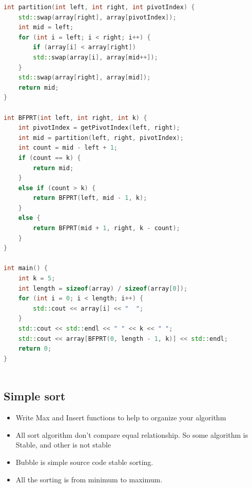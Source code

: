 \documentclass[a4paper,11pt,twoside]{book}
\begin{document}
\begin{itemize}
\begin{lstlisting}[frame=single, language=c++, basicstyle=\scriptsize]
int partition(int left, int right, int pivotIndex) {
	std::swap(array[right], array[pivotIndex]);
	int mid = left;
	for (int i = left; i < right; i++) {
		if (array[i] < array[right])
		std::swap(array[i], array[mid++]);
	}
	std::swap(array[right], array[mid]);
	return mid;
}

int BFPRT(int left, int right, int k) {
	int pivotIndex = getPivotIndex(left, right);
	int mid = partition(left, right, pivotIndex);
	int count = mid - left + 1;
	if (count == k) {
		return mid;
	}
	else if (count > k) {
		return BFPRT(left, mid - 1, k);
	}
	else {
		return BFPRT(mid + 1, right, k - count);
	}
}

int main() {
	int k = 5;
	int length = sizeof(array) / sizeof(array[0]);
	for (int i = 0; i < length; i++) {
		std::cout << array[i] << "  ";
	}
	std::cout << std::endl << " " << k << " ";
	std::cout << array[BFPRT(0, length - 1, k)] << std::endl;
	return 0;
}
	
\end{lstlisting}

\end{itemize}

\subsection{Simple sort}
\begin{itemize}
	\item Write Max and Insert functions to help to organize your algorithm
	\item All sort algorithm don't compare equal relationship. So some algorithm is Stable, and other is not stable
	\item Bubble is simple source code stable sorting. 
	\item All the sorting is from minimum to maximum.
\end{itemize}
 
\end{document}
